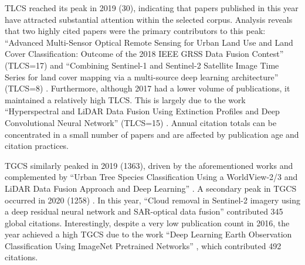 \documentclass[]{interact}
\theoremstyle{plain}%
\theoremstyle{definition}
\theoremstyle{remark}
\DeclareRobustCommand{\DIFadd}[1]{{\protect\color{DIFaddcolor}\uwave{#1}}}
\DeclareRobustCommand{\DIFdel}[1]{{\protect\color{DIFdelcolor}\sout{#1}}}
\def\DIFadd#1{#1}%
\def\DIFdel#1{}%
\begin{document}
TLCS reached its peak in 2019 (30), indicating that papers published in this year have attracted substantial attention within the \DIFdel{specialized} \DIFdel{LULC} \DIFdel{community} \DIFadd{selected} \DIFadd{corpus}. Analysis reveals that two highly cited papers were the primary contributors to this peak: ``Advanced Multi-Sensor Optical Remote Sensing for Urban Land Use and Land Cover Classification: Outcome of the 2018 IEEE GRSS Data Fusion Contest'' (TLCS=17) \citep{21} and ``Combining Sentinel-1 and Sentinel-2 Satellite Image Time Series for land cover mapping via a multi-source deep learning architecture'' (TLCS=8) \citep{22}. Furthermore, although 2017 had a lower volume of publications, it maintained a relatively high TLCS. This is largely due to the \DIFdel{influential} work ``Hyperspectral and LiDAR Data Fusion Using Extinction Profiles and Deep Convolutional Neural Network'' (TLCS=15) \citep{23}. \DIFdel{Given} \DIFdel{that} \DIFdel{deep} \DIFdel{learning} \DIFadd{Annual} \DIFadd{citation} \DIFadd{totals} \DIFadd{can} \DIFadd{be} \DIFadd{concentrated} \DIFadd{in} \DIFadd{a} \DIFadd{small} \DIFadd{number} \DIFadd{of} \DIFadd{papers} and \DIFdel{multi-source} \DIFdel{fusion} are \DIFdel{contemporary} \DIFdel{research} \DIFdel{hotspots}\DIFdel{,} \DIFdel{these} \DIFdel{studies} \DIFdel{have} \DIFdel{naturally} \DIFdel{attracted} \DIFdel{extensive} \DIFdel{attention} \DIFadd{affected} \DIFadd{by} \DIFadd{publication} \DIFadd{age} \DIFadd{and} \DIFadd{citation} \DIFadd{practices}.

TGCS similarly peaked in 2019 (1363), driven by the aforementioned works and complemented by ``Urban Tree Species Classification Using a WorldView-2/3 and LiDAR Data Fusion Approach and Deep Learning'' {\hypersetup{citecolor=red}\color{red}\citep{ORIG26}} {\color{blue}\citep{26}}. A secondary peak in TGCS occurred in 2020 (1258)\DIFdel{,} \DIFdel{aligning} \DIFdel{with} \DIFdel{the} \DIFdel{TLCS} \DIFdel{trend}. In this year, ``Cloud removal in Sentinel-2 imagery using a deep residual neural network and SAR-optical data fusion'' \citep{27} contributed \DIFdel{significantly} \DIFdel{with} 345 global citations. Interestingly, despite a very low publication count in 2016, the year achieved a \DIFdel{remarkably} high TGCS due to the \DIFdel{seminal} work ``Deep Learning Earth Observation Classification Using ImageNet Pretrained Networks'' \citep{28}, which contributed 492 citations.

\DIFdel{It} \DIFdel{is} \DIFdel{obvious} \DIFdel{that} \DIFdel{high-impact}
\end{document}
